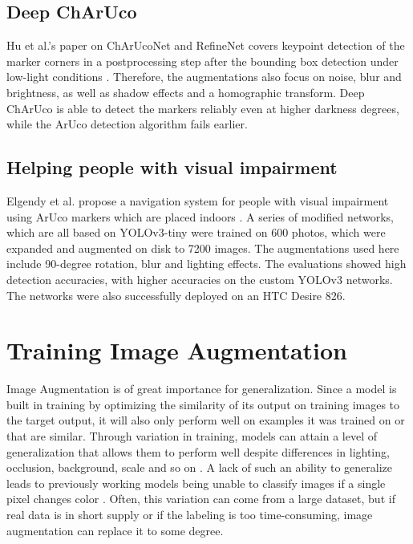 \documentclass[10pt]{book}
\begin{document}
\subsection{Deep ChArUco}

Hu et al.'s paper on ChArUcoNet and RefineNet covers keypoint detection of the marker corners in a postprocessing step after the bounding box detection under low-light conditions \cite{hu2019deep}. Therefore, the augmentations also focus on noise, blur and brightness, as well as shadow effects and a homographic transform. Deep ChArUco is able to detect the markers reliably even at higher darkness degrees, while the \ac{ArUco} detection algorithm fails earlier. 

\subsection{Helping people with visual impairment}

Elgendy et al. propose a navigation system for people with visual impairment using \ac{ArUco} markers which are placed indoors \cite{elgendy2021novel}. A series of modified networks, which are all based on \ac{YOLO}v3-tiny were trained on 600 photos, which were expanded and augmented on disk to 7200 images. The augmentations used here include 90-degree rotation, blur and lighting effects. The evaluations showed high detection accuracies, with higher accuracies on the custom \ac{YOLO}v3 networks. The networks were also successfully deployed on an HTC Desire 826.

\section{Training Image Augmentation}

Image Augmentation is of great importance for generalization. Since a model is built in training by optimizing the similarity of its output on training images to the target output, it will also only perform well on examples it was trained on or that are similar. Through variation in training, models can attain a level of generalization that allows them to perform well despite differences in lighting, occlusion, background, scale and so on \cite{shorten2019survey}. A lack of such an ability to generalize leads to previously working models being unable to classify images if a single pixel changes color \cite{8601309}. Often, this variation can come from a large dataset, but if real data is in short supply or if the labeling is too time-consuming, image augmentation can replace it to some degree.
\end{document}
